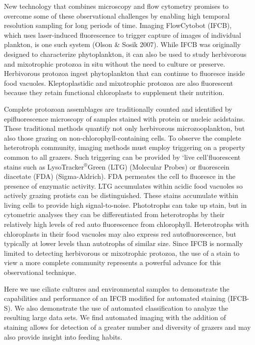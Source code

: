 New technology that combines microscopy and flow cytometry promises to overcome some of these observational challenges by enabling high temporal resolution sampling for long periods of time. Imaging FlowCytobot (IFCB), which uses laser-induced fluorescence to trigger capture of images of individual plankton, is one such system (Olson \& Sosik 2007). While IFCB was originally designed to characterize phytoplankton, it can also be used to study herbivorous and mixotrophic protozoa in situ without the need to culture or preserve. Herbivorous protozoa ingest phytoplankton that can continue to fluoresce inside food vacuoles. Kleptoplastidic and mixotrophic protozoa are also fluorescent because they retain functional chloroplasts to supplement their nutrition.

Complete protozoan assemblages are traditionally counted and identified by epifluorescence microscopy of samples stained with protein or nucleic acidstains. These traditional methods quantify not only herbivorous microzooplankton, but also those grazing on non-chlorophyll-containing cells. To observe the complete heterotroph community, imaging methods must employ triggering on a property common to all grazers. Such triggering can be provided by \lq{live cell}\rq \hspace{0.2cm}fluorescent stains such as LysoTracker$^{\circledR}$Green (LTG) (Molecular Probes) or fluorescein diacetate (FDA) (Sigma-Aldrich). FDA permeates the cell to fluoresce in the presence of enzymatic activity. LTG accumulates within acidic food vacuoles so actively grazing protists can be distinguished. These stains accumulate within living cells to provide high signal-to-noise. Phototrophs can take up stain, but in cytometric analyses they can be differentiated from heterotrophs by their relatively high levels of red auto fluorescence from chlorophyll. Heterotrophs with chloroplasts in their food vacuoles may also express red autofluorescence, but typically at lower levels than autotrophs of similar size. Since IFCB is normally limited to detecting herbivorous or mixotrophic protozoa, the use of a stain to view a more complete community represents a powerful advance for this observational technique. 

Here we use ciliate cultures and environmental samples to demonstrate the capabilities and performance of an IFCB modified for automated staining (IFCB-S). We also demonstrate the use of automated classification to analyze the resulting large data sets. We find automated imaging with the addition of staining allows for detection of a greater number and diversity of grazers and may also provide insight into feeding habits.

